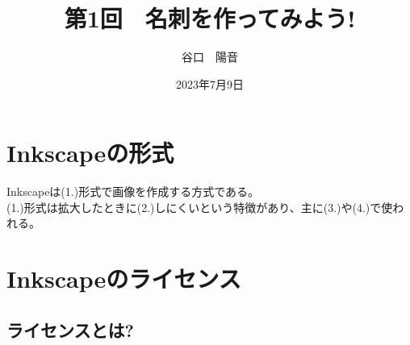 \documentclass{ltjsarticle}
\begin{document}
\title{第1回　名刺を作ってみよう!}
\author{谷口　陽音}
\date{2023年7月9日}
\maketitle

\section{Inkscapeの形式}
Inkscapeは(1.\hspace{4\zw})形式で画像を作成する方式である。\\
(1.)形式は拡大したときに(2.\hspace{3\zw})しにくいという特徴があり、主に(3.\hspace{3\zw})や(4.\hspace{5\zw})で使われる。\\

\section{Inkscapeのライセンス}
\subsection{ライセンスとは?}
\end{document}
